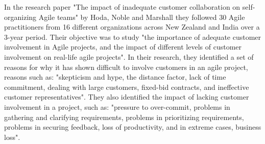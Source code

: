 In the research paper "The impact of inadequate customer collaboration on self-organizing Agile teams" by Hoda, Noble and Marshall \cite{Hoda2011TheIO} they followed 30 Agile practitioners from 16 different organizations across New Zealand and India over a 3-year period. 
Their objective was to study "the importance of adequate customer involvement in Agile projects, and the impact of different levels of customer involvement on real-life agile projects". 
In their research, they identified a set of reasons for why it has shown difficult to involve customers in an agile project, reasons such as: "skepticism and hype, the distance factor, lack of time commitment, dealing with large customers, fixed-bid contracts, and ineffective customer representatives". 
They also identified the impact of lacking customer involvement in a project, such as: "pressure to over-commit, problems in gathering and clarifying requirements, problems in prioritizing requirements, problems in securing feedback, loss of productivity, and in extreme cases, business loss". \cite{Hoda2011TheIO}


